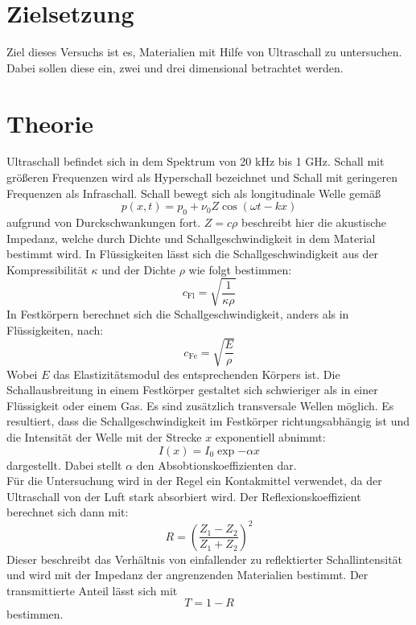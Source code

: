 \section{Zielsetzung}
Ziel dieses Versuchs ist es, Materialien mit Hilfe von Ultraschall zu untersuchen.
Dabei sollen diese ein, zwei und drei dimensional betrachtet werden.
\section{Theorie}
\label{sec:Theorie}
Ultraschall befindet sich in dem Spektrum von 20 kHz bis 1 GHz.
Schall mit größeren Frequenzen wird als Hyperschall bezeichnet und Schall mit geringeren Frequenzen als Infraschall.
Schall bewegt sich als longitudinale Welle gemäß
\begin{equation}
  p(x,t) = p_0 + \nu_0 Z \cos{(\omega t - k x)}
\end{equation}
 aufgrund von Durckschwankungen fort.
 $Z=c \rho$ beschreibt hier die akustische Impedanz, welche durch Dichte und Schallgeschwindigkeit in dem Material bestimmt wird.
In Flüssigkeiten lässt sich die Schallgeschwindigkeit aus der Kompressibilität $\kappa$ und der Dichte $\rho$ wie folgt bestimmen:
 \begin{equation}
  c_\text{Fl}=\sqrt{\frac{1}{\kappa \rho}}   
 \end{equation}
 In Festkörpern berechnet sich die Schallgeschwindigkeit, anders als in Flüssigkeiten, nach:
 \begin{equation}
  c_\text{Fe}=\sqrt{\frac{E}{\rho}}   
 \end{equation}
Wobei $E$ das Elastizitätsmodul des entsprechenden Körpers ist.
Die Schallausbreitung in einem Festkörper gestaltet sich schwieriger als in einer Flüssigkeit oder einem Gas.
Es sind zusätzlich transversale Wellen möglich.
Es resultiert, dass die Schallgeschwindigkeit im Festkörper richtungsabhängig ist und die Intensität der Welle mit der Strecke $x$ exponentiell abnimmt:
\begin{equation}
  I(x) = I_0 \exp{- \alpha x}
\end{equation}
dargestellt. Dabei stellt $\alpha$ den Absobtionskoeffizienten dar.
\\Für die Untersuchung wird in der Regel ein Kontakmittel verwendet, da der Ultraschall von der Luft stark absorbiert wird.
Der Reflexionskoeffizient berechnet sich dann mit:
\begin{equation}
  R=\left(\frac{Z_1 - Z_2}{Z_1 + Z_2}\right)^2
\end{equation}
Dieser beschreibt das Verhältnis von einfallender zu reflektierter Schallintensität und wird mit der Impedanz der angrenzenden Materialien bestimmt.
Der transmittierte Anteil lässt sich mit
\begin{equation}
  T= 1-R
\end{equation}
bestimmen.

